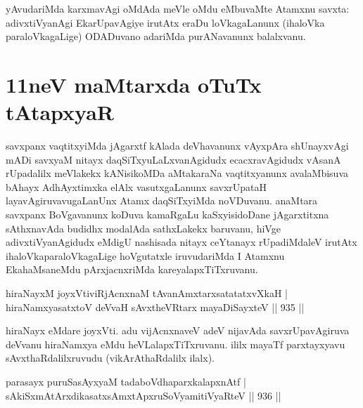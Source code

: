 \begin{artha}
yAvudariMda karxmavAgi oMdAda meVle oMdu eMbuvaMte Atamxnu savxta: adivxtiVyanAgi EkarUpavAgiye irutAtx eraDu loVkagaLanunx (ihaloVka paraloVkagaLige) ODADuvano adariMda purANavanunx balalxvanu.
\end{artha}


\section*{11neV maMtarxda oTuTx tAtapxyaR}

\begin{artha}
savxpanx vaqtitxyiMda jAgarxtf kAlada deVhavanunx vAyxpAra shUnayxvAgi mADi savxyaM nitayx daqSiTxyuLaLxvanAgidudx ecacxravAgidudx vAsanA rUpadalilx meVlakekx kANisikoMDa aMtakaraNa vaqtitxyanunx avalaMbisuva bAhayx AdhAyxtimxka elAlx vasutxgaLanunx savxrUpataH layavAgiruvavugaLanUnx Atamx daqSiTxyiMda noVDuvanu. anaMtara savxpanx BoVgavanunx koDuva kamaRgaLu kaSxyisidoDane jAgarxtitxna sAthxnavAda budidhx modalAda sathxLakekx baruvanu, hiVge adivxtiVyanAgidudx eMdigU nashisada nitayx ceYtanayx rUpadiMdaleV irutAtx ihaloVkaparaloVkagaLige hoVgutatxle iruvudariMda I Atamxnu EkahaMsaneMdu pArxjacnxriMda kareyalapxTiTxruvanu.
\end{artha}


\begin{shl}
hiraNayxM joyxVtiviRjAcnxnaM tAvanAmxtarxsatatatxvXkaH | \\
hiraNamxyasatxtoV deVvaH sAvxtheVR\s tarx mayaDiSayxteV \hfill||  935 ||  
\end{shl}

\begin{artha}
hiraNayx eMdare joyxVti. adu vijAcnxnaveV adeV nijavAda savxrUpavAgiruva deVvanu hiraNamxya eMdu heVLalapxTiTxruvanu. ililx mayaTf parxtayxyavu sAvxthaRdalilxruvudu (vikArAthaRdalilx ilalx).
\end{artha}


\begin{shl}
parasayx puruSasAyxyaM tadaboVdhaparxkalapxnAtf | \\
sAkiSxmAtArxdikasatxsAmxtApxruSoV\s yamitiVyaRteV \hfill||  936 ||  
\end{shl}

